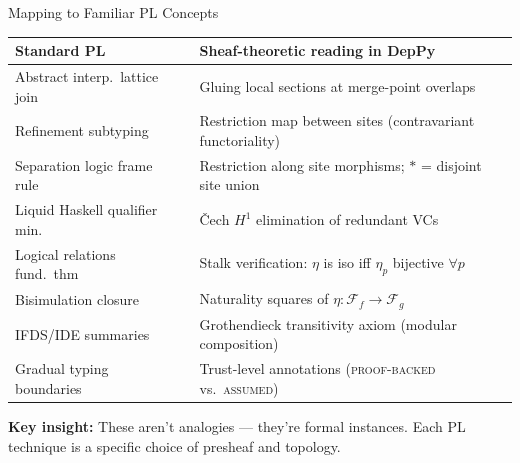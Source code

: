 \documentclass[aspectratio=169,10pt]{beamer}
\newcommand{\Sem}{\mathcal{F}}
\newcommand{\keyinsight}[1]{%
  \vspace{2pt}
  \begin{center}
  \colorbox{sheafbox}{\parbox{0.88\textwidth}{\centering\small\textbf{\textcolor{keyblue}{Key insight:}} #1}}
  \end{center}
  \vspace{-4pt}
}
\begin{document}
\begin{frame}{Mapping to Familiar PL Concepts}

\vspace{-0.3em}
{\small
\renewcommand{\arraystretch}{1.15}
\begin{tabular}{@{}p{4.2cm}p{0.3cm}p{7.5cm}@{}}
\textbf{Standard PL} && \textbf{Sheaf-theoretic reading in DepPy} \\
\hline
Abstract interp.\ lattice join
  && Gluing local sections at merge-point overlaps \\
Refinement subtyping
  && Restriction map between sites (contravariant functoriality) \\
Separation logic frame rule
  && Restriction along site morphisms; $*$ = disjoint site union \\
Liquid Haskell qualifier min.
  && \v{C}ech $H^1$ elimination of redundant VCs \\
Logical relations fund.\ thm
  && Stalk verification: $\eta$ is iso iff $\eta_p$ bijective $\forall p$ \\
Bisimulation closure
  && Naturality squares of $\eta: \Sem_f \to \Sem_g$ \\
IFDS/IDE summaries
  && Grothendieck transitivity axiom (modular composition) \\
Gradual typing boundaries
  && Trust-level annotations (\textsc{proof-backed} vs.\ \textsc{assumed}) \\
\end{tabular}
}

\keyinsight{These aren't analogies --- they're formal instances.
Each PL technique is a specific choice of presheaf and topology.}

\end{frame}
\end{document}
